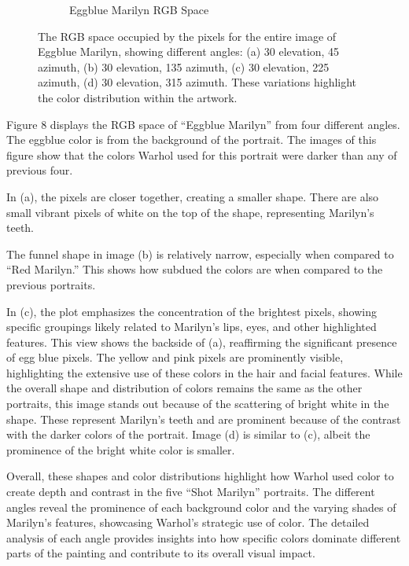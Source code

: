 \documentclass{article}
\begin{document}
\begin{figure}[ht]
\begin{subfigure}{0.45\textwidth}
    \caption{Eggblue Marilyn RGB Space}
    \label{fig:4_20_eggblue_marilyn_original_scatter}
  \end{subfigure}
  \caption{The RGB space occupied by the pixels for the entire image of Eggblue Marilyn, showing different angles: (a) 30 \degree elevation, 45 \degree azimuth, (b) 30 \degree elevation, 135 \degree azimuth, (c) 30 \degree elevation, 225 \degree azimuth, (d) 30 \degree elevation, 315 \degree azimuth. These variations highlight the color distribution within the artwork.}
  \label{fig:eggblue_marilyn_original_scatter_2}
\end{figure}

Figure 8 displays the RGB space of ``Eggblue Marilyn'' from four
different angles. The eggblue color is from the background of the
portrait. The images of this figure show that the colors Warhol used for
this portrait were darker than any of previous four.

In (a), the pixels are closer together, creating a smaller shape. There
are also small vibrant pixels of white on the top of the shape,
representing Marilyn's teeth.

The funnel shape in image (b) is relatively narrow, especially when
compared to ``Red Marilyn.'' This shows how subdued the colors are when
compared to the previous portraits.

In (c), the plot emphasizes the concentration of the brightest pixels,
showing specific groupings likely related to Marilyn's lips, eyes, and
other highlighted features. This view shows the backside of (a),
reaffirming the significant presence of egg blue pixels. The yellow and
pink pixels are prominently visible, highlighting the extensive use of
these colors in the hair and facial features. While the overall shape
and distribution of colors remains the same as the other portraits, this
image stands out because of the scattering of bright white in the shape.
These represent Marilyn's teeth and are prominent because of the
contrast with the darker colors of the portrait. Image (d) is similar to
(c), albeit the prominence of the bright white color is smaller.

Overall, these shapes and color distributions highlight how Warhol used
color to create depth and contrast in the five ``Shot Marilyn''
portraits. The different angles reveal the prominence of each background
color and the varying shades of Marilyn's features, showcasing Warhol's
strategic use of color. The detailed analysis of each angle provides
insights into how specific colors dominate different parts of the
painting and contribute to its overall visual impact.
\end{document}
